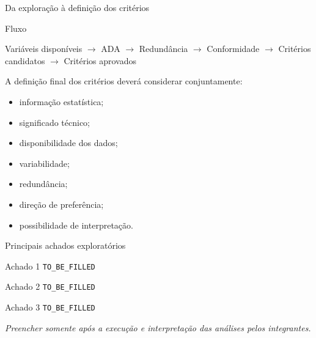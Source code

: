 
\begin{frame}{Da exploração à definição dos critérios}

    \begin{block}{Fluxo}
        \centering

        Variáveis disponíveis
        $\rightarrow$
        ADA
        $\rightarrow$
        Redundância
        $\rightarrow$
        Conformidade
        $\rightarrow$
        Critérios candidatos
        $\rightarrow$
        Critérios aprovados
    \end{block}

    \vspace{0.4cm}

    A definição final dos critérios deverá considerar conjuntamente:

    \begin{itemize}
        \item informação estatística;
        \item significado técnico;
        \item disponibilidade dos dados;
        \item variabilidade;
        \item redundância;
        \item direção de preferência;
        \item possibilidade de interpretação.
    \end{itemize}

\end{frame}



\begin{frame}{Principais achados exploratórios}

    \begin{block}{Achado 1}
        \texttt{TO\_BE\_FILLED}
    \end{block}

    \begin{block}{Achado 2}
        \texttt{TO\_BE\_FILLED}
    \end{block}

    \begin{block}{Achado 3}
        \texttt{TO\_BE\_FILLED}
    \end{block}

    \vspace{0.3cm}

    \centering

    \textit{Preencher somente após a execução e interpretação das análises
    pelos integrantes.}

\end{frame}



